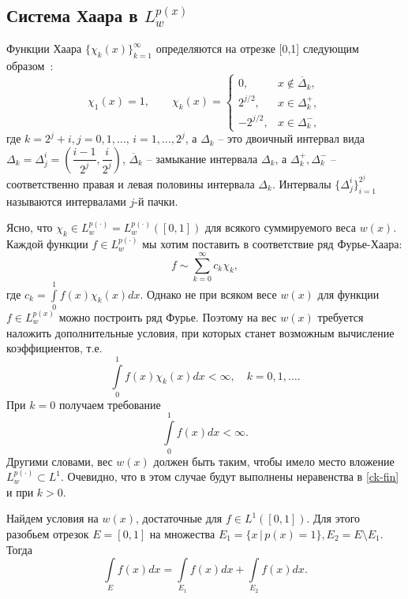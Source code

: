 \subsection{Система Хаара в $L^{p(x)}_w$}\label{section-hep}
Функции Хаара $\{\chi_k(x)\}_{k=1}^\infty$ определяются на отрезке [0,1] следующим образом~\cite{kashin}:
\begin{equation*}
\chi_1(x)=1,\qquad
\chi_k(x)=\begin{cases}
0,&x\notin\overline{\Delta}_k,\\
2^{j/2},&x\in\Delta_k^+,\\
-2^{j/2},&x\in\Delta_k^-,
\end{cases}
\end{equation*}
где $k=2^j+i, j=0,1,\ldots, \,i=1,\ldots,2^j$, а $\Delta_k$ -- это двоичный интервал вида $\Delta_k=\Delta_j^i=\left(\dfrac{i-1}{2^j},\dfrac{i}{2^j}\right)$, $\overline{\Delta}_k$ -- замыкание интервала $\Delta_k$, а $\Delta_k^+, \Delta_k^-$ -- соответственно правая и левая половины интервала $\Delta_k$. Интервалы $\{\Delta_j^i\}_{i=1}^{2^j}$ называются интервалами $j$-й пачки.

Ясно, что $\chi_k \in L^{p(\cdot)}_w = L^{p(\cdot)}_w([0,1])$ для всякого суммируемого веса $w(x)$. Каждой функции $f\in L^{p(\cdot)}_w$ мы хотим поставить в соответствие ряд Фурье-Хаара:
\begin{equation}\label{FourierSeries}
  f \sim \sum\limits_{k=0}^\infty c_k\chi_k,
\end{equation}
где $c_k=\int\limits_0^1 f(x)\chi_k(x)dx$.
Однако не при всяком весе $w(x)$ для функции $f\in L^{p(x)}_w$ можно построить ряд Фурье.
Поэтому на вес $w(x)$ требуется наложить дополнительные условия, при которых станет возможным вычисление коэффициентов, т.е.
\begin{equation}\label{ck-fin}
  \int\limits_0^1 f(x)\chi_k(x)dx < \infty, \quad k=0,1,\ldots.
\end{equation}
При $k=0$ получаем требование
\begin{equation*}
  \int\limits_0^1 f(x)dx < \infty.
\end{equation*}
Другими словами, вес $w(x)$ должен быть таким, чтобы имело место вложение $L^{p(\cdot)}_w \subset L^1$. Очевидно, что в этом случае будут выполнены неравенства в \eqref{ck-fin} и при $k>0$.

Найдем условия на $w(x)$, достаточные для $f \in L^1([0,1])$. Для этого разобьем отрезок $E=[0,1]$ на множества $E_1=\{x \,|\, p(x)=1\}, E_2=E \setminus E_1$. Тогда
\begin{equation}\label{sumInt}
  \int\limits_E f(x)dx =   \int\limits_{E_1} f(x)dx +  \int\limits_{E_2} f(x)dx.
\end{equation}

